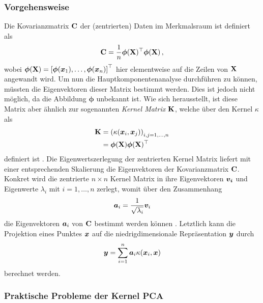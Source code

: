 \subsubsection{Vorgehensweise}
\label{ch:MethodenDerDimRed:statistisch:kPCA:Vorgehensweise}
Die Kovarianzmatrix $\mathbf{C}$ der (zentrierten) Daten im Merkmalsraum ist definiert als
\begin{equation}
	\mathbf{C} = \frac{1}{n} \bm{\phi}(\mathbf{X})^\top \bm{\phi}(\mathbf{X}) \, ,
\end{equation}
wobei $\bm{\phi}(\mathbf{X}) = \left[ \bm{\phi}(\bm{x}_1), \ldots, \bm{\phi}(\bm{x}_n) \right]^\top$ hier elementweise auf die Zeilen von $\mathbf{X}$ angewandt wird. Um nun die Hauptkomponentenanalyse durchführen zu können, müssten die Eigenvektoren dieser Matrix bestimmt werden. Dies ist jedoch nicht möglich, da die Abbildung $\bm{\phi}$ unbekannt ist. Wie sich herausstellt, ist diese Matrix aber ähnlich zur sogenannten \textit{Kernel Matrix} $\mathbf{K}$, welche über den Kernel $\kappa$ als
\begin{align}
	\mathbf{K} & = \left( \kappa(\bm{x}_i, \bm{x}_j) \right)_{i,j = 1,\ldots,n} \label{eq:kPCA:KernelMatrix_A} \\
	        & = \bm{\phi}(\mathbf{X}) \bm{\phi}(\mathbf{X})^\top \label{eq:kPCA:KernelMatrix_B}
\end{align}
definiert ist \parencite[68]{ShaweTaylor.2011}. Die Eigenwertszerlegung der zentrierten Kernel Matrix liefert mit
einer entsprechenden Skalierung die Eigenvektoren der Kovarianzmatrix $\mathbf{C}$. Konkret wird die
zentrierte $n \times n$ Kernel Matrix in ihre Eigenvektoren $\bm{v_i}$ und Eigenwerte $\lambda_i$
mit $i = 1, \ldots, n$ zerlegt, womit über den Zusammenhang
\begin{equation}
	\label{eq:kPCA:ZusammenhangEigenvektoren}
	\bm{a}_i = \frac{1}{\sqrt{\lambda_i}} \bm{v}_i
\end{equation}
die Eigenvektoren $\bm{a}_i$ von $\mathbf{C}$ bestimmt werden können \parencite[142]{ShaweTaylor.2011}. Letztlich kann die Projektion eines Punktes $\bm{x}$ auf die
niedrigdimensionale Repräsentation $\bm{y}$ durch
\begin{equation}
	\bm{y} = \sum_{i=1}^n \bm{a}_i \kappa(\bm{x}_i, \bm{x})
\end{equation}
berechnet werden.

\subsubsection{Praktische Probleme der Kernel PCA}
\label{ch:MethodenDerDimRed:statistisch:kPCA:AuswahlKF}

